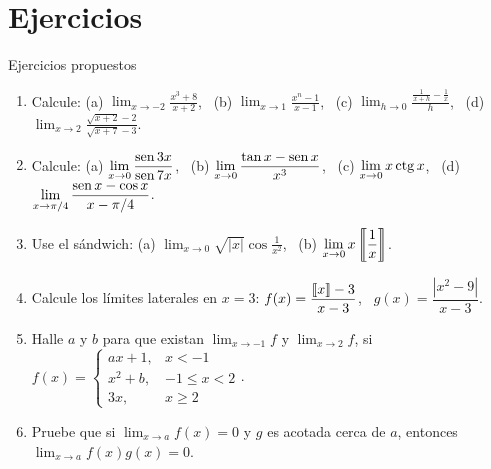 \documentclass[10pt,aspectratio=169]{beamer}
\begin{document}
\section{Ejercicios}

\begin{frame}{Ejercicios propuestos}
  \small
  \begin{ejercicio}
    \begin{enumerate}
      \item Calcule: (a) $\displaystyle\lim_{x\to-2}\frac{x^3+8}{x+2}$, \ (b) $\displaystyle\lim_{x\to1}\frac{x^n-1}{x-1}$, \ (c) $\displaystyle\lim_{h\to0}\frac{\frac1{x+h}-\frac1x}{h}$,
        \ (d) $\displaystyle\lim_{x\to2}\frac{\sqrt{x+2}-2}{\sqrt{x+7}-3}$.
      \item Calcule: (a) $\displaystyle\lim_{x\to0}\frac{\operatorname{sen}3x}{\operatorname{sen}7x}$, \ (b) $\displaystyle\lim_{x\to0}\frac{\tan x-\operatorname{sen} x}{x^3}$, \ (c) $\displaystyle\lim_{x\to0}x\operatorname{ctg} x$,
        \ (d) $\displaystyle\lim_{x\to\pi/4}\frac{\operatorname{sen} x-\cos x}{x-\pi/4}$.
      \item Use el sándwich: (a) $\displaystyle\lim_{x\to0}\sqrt{|x|}\cos\frac1{x^2}$, \ (b) $\displaystyle\lim_{x\to0}x\left\llbracket \frac1x\right\rrbracket$.
      \item Calcule los límites laterales en $x=3$: $f(x)=\dfrac{\left\llbracket x\right\rrbracket-3}{x-3}$, \ $g(x)=\dfrac{|x^2-9|}{x-3}$.
      \item Halle $a$ y $b$ para que existan $\lim_{x\to-1}f$ y $\lim_{x\to2}f$, si $f(x)=\begin{cases}ax+1,&x<-1\\ x^2+b,&-1\le x<2\\ 3x,&x\ge2\end{cases}$.
      \item Pruebe que si $\lim_{x\to a}f(x)=0$ y $g$ es acotada cerca de $a$, entonces $\lim_{x\to a}f(x)g(x)=0$.
    \end{enumerate}
  \end{ejercicio}
\end{frame}
\end{document}

